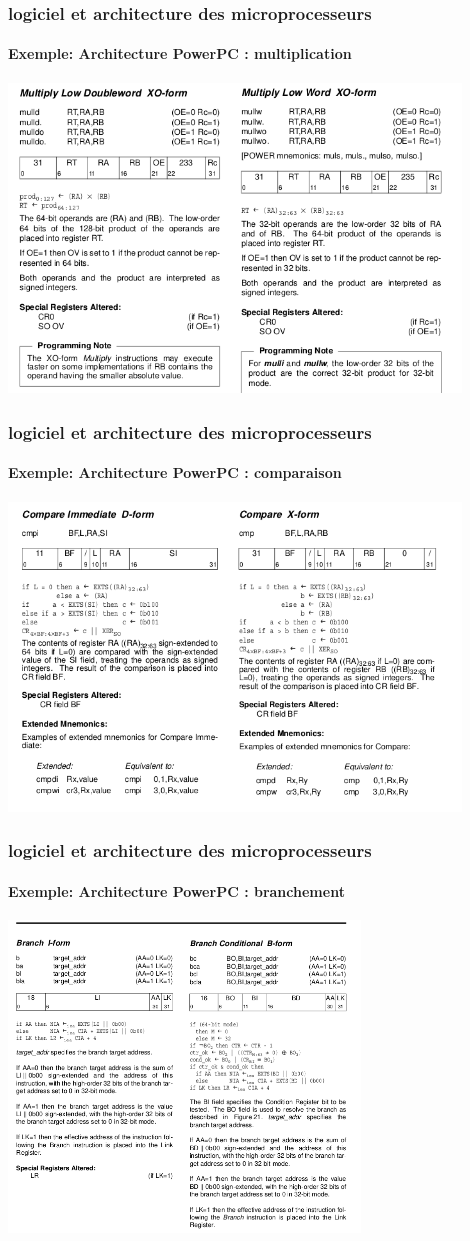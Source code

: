 \documentclass[xcolor=svgnames,final,smaller,a4]{beamer}
\begin{document}
\begin{frame}
  \frametitle{logiciel et architecture des microprocesseurs}
  \framesubtitle{Exemple: Architecture PowerPC : multiplication}
  \includegraphics[width=0.9\textwidth]{powerpc-mult-instr}
\end{frame}

\begin{frame}
  \frametitle{logiciel et architecture des microprocesseurs}
  \framesubtitle{Exemple: Architecture PowerPC : comparaison}
  \includegraphics[width=0.9\textwidth]{powerpc-compare-instr}
\end{frame}

\begin{frame}
  \frametitle{logiciel et architecture des microprocesseurs}
  \framesubtitle{Exemple: Architecture PowerPC : branchement}
  \includegraphics[width=0.7\textwidth]{powerpc-branch-instr}
\end{frame}
\end{document}
